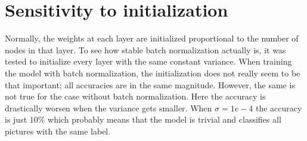 \documentclass[12pt, a4paper]{article}
\begin{document}
\section{Sensitivity to initialization}
Normally, the weights at each layer are initialized proportional to the number of nodes in that layer. To see how stable batch normalization actually is, it was tested to initialize every layer with the same constant variance. When training the model with batch normalization, the initialization does not really seem to be that important; all accuracies are in the same magnitude. However, the same is not true for the case without batch normalization. Here the accuracy is drastically worsen when the variance gets smaller. When $\sigma=1e-4$ the accuracy is just $10\%$ which probably means that the model is trivial and classifies all pictures with the same label.
\end{document}
